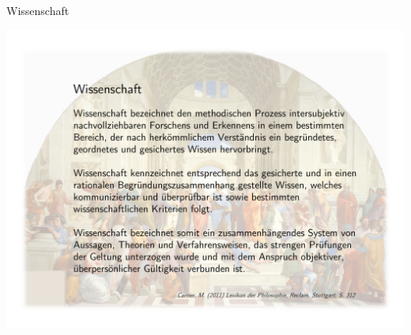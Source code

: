 \documentclass[
  8pt,
  ignorenonframetext,
]{beamer}
\begin{document}
\begin{frame}{Wissenschaft}
\protect\hypertarget{wissenschaft}{}
\begin{center}\includegraphics[width=1\linewidth]{1_Abbildungen/pfm_1_wissenschaft_definition} \end{center}
\end{frame}
\end{document}
